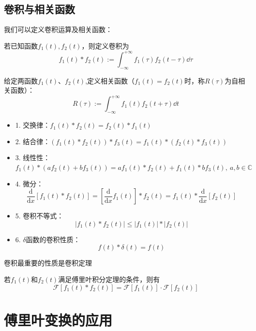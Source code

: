 \subsection{卷积与相关函数}
我们可以定义卷积运算及相关函数：
\begin{definition}[卷积]
若已知函数$f_1(t),f_2(t)$，则定义卷积为
\[f_1(t)\ast f_2(t):=\int_{-\infty}^{+\infty}f_1(\tau)f_2(t-\tau)\dd{\tau}\] 
\end{definition}
\begin{definition}[相关函数]
给定两函数$f_1(t)$、$f_2(t)$,定义相关函数（$f_1(t)=f_2(t)$时，称$R(\tau)$为自相关函数）：
\[R(\tau):=\int_{-\infty}^{+\infty}f_1(t)f_2(t+\tau)\dd{t}\]
\end{definition}
\begin{proposition}[卷积的性质]
\begin{itemize}
\item 1. 交换律：$f_1(t)\ast f_2(t)=f_2(t)\ast f_1(t)$
\item 2. 结合律：$(f_1(t) \ast f_2(t)) \ast f_3(t)=f_1(t) \ast (f_2(t) \ast f_3(t))$
\item 3. 线性性：$f_1(t) \ast (af_2(t)+bf_3(t))=af_1(t) \ast f_2(t)+f_1(t) \ast bf_3(t),  \ a,b\in\mathbb{C}$
\item 4. 微分：
\[\frac{\mathrm {d}}{\mathrm {d}x}[f_1(t)\ast f_2(t)]=[\frac{\mathrm {d}}{\mathrm {d}x}f_1(t)]\ast f_2(t)=f_1(t)\ast\frac{\mathrm {d}}{\mathrm {d}x}[ f_2(t)]\]
\item 5. 卷积不等式：
\[|f_1(t)\ast f_2(t)| \leqslant |f_1(t)|\ast |f_2(t)|\]
\item 6. $\delta$函数的卷积性质：
\[f(t) \ast \delta(t)=f(t)\]
\end{itemize}
\end{proposition}
卷积最重要的性质是卷积定理
\begin{theorem}[卷积定理]
    若$f_1(t)$和$f_2(t)$满足傅里叶积分定理的条件，则有
\[\mathcal{F}[f_1(t) \ast f_2(t)]=\mathcal{F}[f_1(t)] \cdot \mathcal{F}[f_2(t)]\]
\end{theorem}

\section{傅里叶变换的应用}
